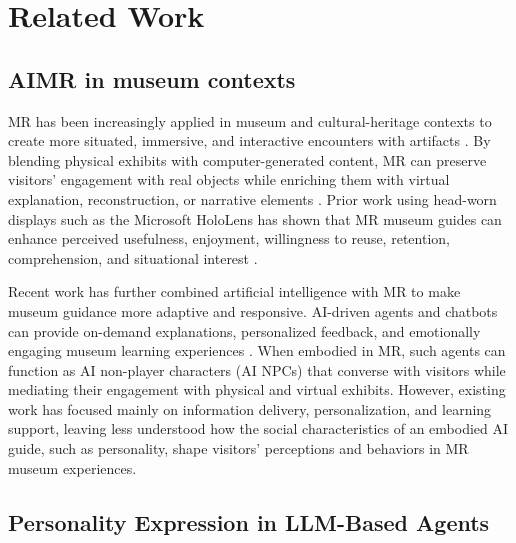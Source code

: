 \documentclass[a4paper,fleqn]{cas-sc}
\begin{document}
\section{Related Work}\label{sec:related-work}

\subsection{AIMR in museum contexts}
MR has been increasingly applied in museum and cultural-heritage contexts to create more situated, immersive, and interactive encounters with artifacts \citep{bekeleSurveyAugmentedVirtual2018, wangSurveyMuseumApplied2022,
marti-testonMethodologyProduceAugmentedReality2021,
trunfioMixedRealityExperiences2022}. By blending physical exhibits with
computer-generated content, MR can preserve visitors' engagement with real objects while enriching them with virtual explanation, reconstruction, or narrative elements \citep{speicherWhatMixedReality2019}. Prior work using head-worn displays such as the Microsoft HoloLens has shown that MR museum
guides can enhance perceived usefulness, enjoyment, willingness to reuse, retention, comprehension, and situational interest \citep{hammadyFrameworkConstructingEvaluating2021,
hammadyAmbientInformationVisualisation2020,
chinApplyingWearableMRbased2024}.

Recent work has further combined artificial intelligence with MR to make museum guidance more adaptive and responsive. AI-driven agents and chatbots can provide on-demand explanations, personalized feedback, and emotionally engaging museum learning experiences \citep{liangEffectAIbasedChatbot2024, yuSystematicReviewIntegrating2025, diarsyaConceptualModelIntegrating,
ribeiroVRARGamification2024}. When embodied in MR, such agents can function as AI non-player characters (AI NPCs) that converse with visitors while mediating their engagement with physical and virtual exhibits. However, existing work has focused mainly on information delivery, personalization, and learning support, leaving less understood how the social characteristics of an embodied AI guide,
such as personality, shape visitors' perceptions and behaviors in MR museum experiences.

\subsection{Personality Expression in LLM-Based Agents}
\end{document}
